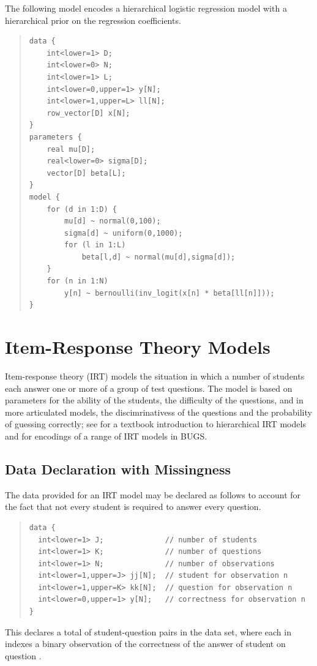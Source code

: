 The following model encodes a hierarchical logistic regression model
with a hierarchical prior on the regression coefficients.
%
\begin{quote}
\begin{Verbatim}
data {
    int<lower=1> D;
    int<lower=0> N;
    int<lower=1> L;
    int<lower=0,upper=1> y[N];
    int<lower=1,upper=L> ll[N];
    row_vector[D] x[N];
}
parameters {
    real mu[D];
    real<lower=0> sigma[D];
    vector[D] beta[L];
}
model {
    for (d in 1:D) {
        mu[d] ~ normal(0,100);
        sigma[d] ~ uniform(0,1000);
        for (l in 1:L)
            beta[l,d] ~ normal(mu[d],sigma[d]);
    }
    for (n in 1:N)
        y[n] ~ bernoulli(inv_logit(x[n] * beta[ll[n]]));
}
\end{Verbatim}
\end{quote}   


\section{Item-Response Theory Models}

Item-response theory (IRT) models the situation in which a number of
students each answer one or more of a group of test questions.  The
model is based on parameters for the ability of the students, the
difficulty of the questions, and in more articulated models, the
discimrinativess of the questions and the probability of guessing
correctly; see \citep[pps.~314--320]{GelmanHill:2007} for a textbook
introduction to hierarchical IRT models and \citep{Curtis:2010} for
encodings of a range of IRT models in BUGS.


\subsection{Data Declaration with Missingness}

The data provided for an IRT model may be declared as follows
to account for the fact that not every student is required to answer
every question.
%
\begin{quote}
\begin{Verbatim}
data {
  int<lower=1> J;              // number of students
  int<lower=1> K;              // number of questions
  int<lower=1> N;              // number of observations
  int<lower=1,upper=J> jj[N];  // student for observation n
  int<lower=1,upper=K> kk[N];  // question for observation n
  int<lower=0,upper=1> y[N];   // correctness for observation n
}
\end{Verbatim}
\end{quote}
%
This declares a total of  student-question pairs in the data
set, where each  in  indexes a binary observation
 of the correctness of the answer of student 
on question .

